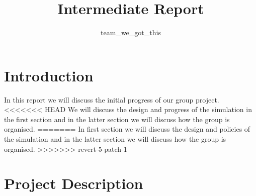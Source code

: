 \documentclass[11pt]{article}
\title{{Intermediate Report}}
\date{}
\author{team\_we\_got\_this}
\begin{document}
	\maketitle
	\thispagestyle{fancy}
	\section{Introduction}
	In this report we will discuss the initial progress of our group project. 
<<<<<<< HEAD
	We will discuss the design and progress of the simulation in the first section and in the latter section we will discuss how the group is organised.
=======
	In first section we will discuss the design and policies of the simulation and in the latter section we will discuss how the group is organised.
>>>>>>> revert-5-patch-1
	
	
	\section{Project Description}
	
\end{document}
